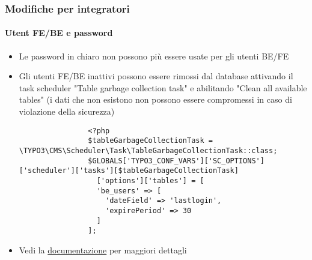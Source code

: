 \begin{frame}[fragile]
	\frametitle{Modifiche per integratori}
	\framesubtitle{Utent FE/BE e password}

	\lstset{basicstyle=\tiny\ttfamily}

	\begin{itemize}
		\item Le password in chiaro non possono più essere usate per gli utenti BE/FE
		\item Gli utenti FE/BE inattivi possono essere rimossi dal database
			attivando il task scheduler "Table garbage collection task" e abilitando
			"Clean all available tables"\newline
			\smaller
				(i dati che non esistono non possono essere compromessi in caso di violazione
					della sicurezza)
			\normalsize

			\begin{lstlisting}
				<?php
				$tableGarbageCollectionTask = \TYPO3\CMS\Scheduler\Task\TableGarbageCollectionTask::class;
				$GLOBALS['TYPO3_CONF_VARS']['SC_OPTIONS']['scheduler']['tasks'][$tableGarbageCollectionTask]
				  ['options']['tables'] = [
				  'be_users' => [
				    'dateField' => 'lastlogin',
				    'expirePeriod' => 30
				  ]
				];
			\end{lstlisting}

		\item Vedi la \href{https://docs.typo3.org/typo3cms/extensions/scheduler/Installation/BaseTasks/Index.html}{documentazione}
			per maggiori dettagli
	\end{itemize}

\end{frame}


